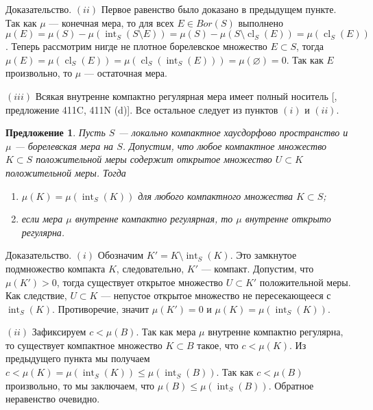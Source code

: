 \documentclass[12pt]{article}
\numberwithin{equation}{subsection}
\theoremstyle{plain}
\newtheorem{proposition}{Предложение}
\newenvironment{proof}{Доказательство.}{}
\begin{document}
\begin{fulltext}
\begin{proof}
        $(ii)$ Первое равенство было доказано в предыдущем пункте. Так как $\mu$
        --- конечная мера, то для всех $E\in Bor(S)$ выполнено
        $\mu(E)=\mu(S)-\mu(\operatorname{int}_S(S\setminus E))
            =\mu(S)-\mu(S\setminus\operatorname{cl}_S(E))
            =\mu(\operatorname{cl}_S(E))$. Теперь рассмотрим
        нигде не плотное борелевское множество $E\subset S$, тогда
        $\mu(E)=\mu(\operatorname{cl}_S(E))
            =\mu(\operatorname{cl}_S(\operatorname{int}_S(E)))
            =\mu(\varnothing)=0$.
        Так как $E$ произвольно, то $\mu$ --- остаточная мера.

        $(iii)$ Всякая внутренне компактно регулярная мера имеет полный носитель
        [\cite{FremMeasTh4.1}, предложение 411C, 411N (d)]. Все остальное
        следует из пунктов $(i)$ и $(ii)$.
    \end{proof}

    \begin{proposition}\label{NormalMeasCharac} Пусть $S$ --- локально
        компактное хаусдорфово пространство и $\mu$ --- борелевская мера на $S$.
        Допустим, что любое компактное множество $K\subset S$ положительной меры
        содержит открытое множество $U\subset K$ положительной меры. Тогда

        \begin{enumerate}[label = (\roman*)]
            \item $\mu(K)=\mu(\operatorname{int}_S(K))$ для любого компактного
                  множества $K\subset S$;

            \item если мера $\mu$ внутренне компактно регулярная, то $\mu$
                  внутренне открыто регулярна.
        \end{enumerate}
    \end{proposition}
    \begin{proof} $(i)$ Обозначим $K'=K\setminus \operatorname{int}_S(K)$. Это
        замкнутое подмножество компакта $K$, следовательно, $K'$ --- компакт.
        Допустим, что $\mu(K')>0$, тогда существует открытое множество $U\subset
            K'$ положительной меры. Как следствие, $U\subset K$ --- непустое
        открытое множество не пересекающееся с $\operatorname{int}_S(K)$.
        Противоречие, значит $\mu(K')=0$ и
        $\mu(K)=\mu(\operatorname{int}_S(K))$.

        $(ii)$ Зафиксируем $c<\mu(B)$. Так как мера $\mu$ внутренне компактно
        регулярна, то существует компактное множество $K\subset B$ такое, что
        $c<\mu(K)$. Из предыдущего пункта мы получаем
        $c<\mu(K)=\mu(\operatorname{int}_S(K))\leq\mu(\operatorname{int}_S(B))$.
        Так как $c<\mu(B)$ произвольно, то мы заключаем, что
        $\mu(B)\leq\mu(\operatorname{int}_S(B))$. Обратное неравенство очевидно.
    \end{proof}


\end{fulltext}
\end{document}
